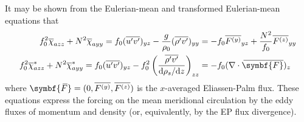 \documentclass{jknotes}
\newcommand{\myol}[2][3]{{}\mkern#1mu\overline{\mkern-#1mu#2}}
\begin{document}
It may be shown from the Eulerian-mean and transformed Eulerian-mean equations
that
\begin{align}
	f_0^2 \overline{\chi}_{azz} + N^2 \overline{\chi}_{ayy} = f_0
	(\overline{u'v'})_{yz} - \frac{g}{\rho_0} (\overline{\rho'v'})_{yy} &= -f_0
	\overline{F^{(y)}}_{yz} + \frac{N^2}{f_0} \overline{F^{(z)}}_{yy}
	\label{eq:mmc_eul}\\
	f_0^2 \overline{\chi}_{azz}^* + N^2 \overline{\chi}_{ayy}^* = f_0
	(\overline{u'v'})_{yz} - f_0^2 \left( \frac{\overline{\rho'v'}}{\diffd
			\rho_s / \diffd z}\right)_{zz} &= -f_0 (\nabla \cdot
			\myol[4]{\symbf{F}})_z\label{eq:mmc_teul}
\end{align}
where $\symbf{\myol[4]{F}} = (0, \overline{F^{(y)}}, \overline{F^{(z)}})$ is
the $x$-averaged Eliassen-Palm flux. These equations express the forcing on
the mean meridional circulation by the eddy fluxes of momentum and density
(or, equivalently, by the EP flux divergence).
\end{document}
